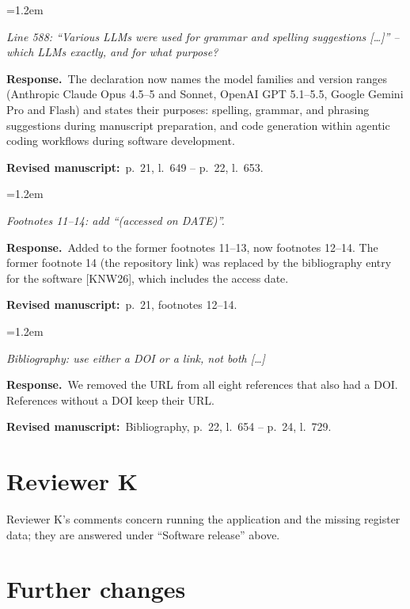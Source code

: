 \documentclass[11pt,a4paper]{article}
\newenvironment{reviewercomment}
  {\par\smallskip\begin{list}{}{\leftmargin=1.2em\rightmargin=0pt}\item[]\color{black!75}\itshape}
  {\end{list}\smallskip}
\newcommand{\response}{\par\noindent\textbf{Response.}~}
\newcommand{\where}[1]{\par\noindent\textbf{Revised manuscript:}~#1\par\medskip}
\begin{document}
\begin{enumerate}[label=\textbf{I\arabic*}, leftmargin=2.2em, itemsep=0.8em]
\item
\begin{reviewercomment}
Line 588: ``Various LLMs were used for grammar and spelling suggestions [\dots]'' -- which LLMs
exactly, and for what purpose?
\end{reviewercomment}
\response The declaration now names the model families and version ranges (Anthropic Claude Opus
4.5--5 and Sonnet, OpenAI GPT 5.1--5.5, Google Gemini Pro and Flash) and states their purposes:
spelling, grammar, and phrasing suggestions during manuscript preparation, and code generation within
agentic coding workflows during software development.
\where{p.~21, l.~649 -- p.~22, l.~653.}

\item
\begin{reviewercomment}
Footnotes 11--14: add ``(accessed on DATE)''.
\end{reviewercomment}
\response Added to the former footnotes 11--13, now footnotes 12--14. The former footnote 14 (the
repository link) was replaced by the bibliography entry for the software [KNW26], which includes the
access date.
\where{p.~21, footnotes 12--14.}

\item
\begin{reviewercomment}
Bibliography: use either a DOI or a link, not both [\dots]
\end{reviewercomment}
\response We removed the URL from all eight references that also had a DOI. References without a DOI
keep their URL.
\where{Bibliography, p.~22, l.~654 -- p.~24, l.~729.}

\end{enumerate}

\section*{Reviewer K}

Reviewer K's comments concern running the application and the missing register data; they are
answered under ``Software release'' above.

\section*{Further changes}
\end{document}
